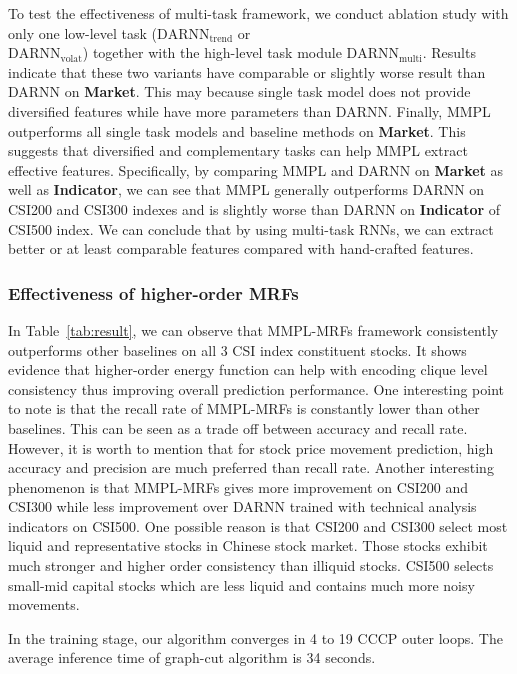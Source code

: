 To test the effectiveness of multi-task framework, we conduct ablation study with only one low-level task (\quad $\text{DARNN}_\text{trend}$ \quad or \\ $\text{DARNN}_\text{volat}$) 
together with the high-level task module $\text{DARNN}_\text{multi}$. Results
indicate that these two variants have comparable or slightly worse result than
 DARNN on \textbf{Market}. This may because single task model does not provide diversified features while have more parameters than DARNN. Finally, MMPL outperforms all single task models and baseline methods on \textbf{Market}. This
suggests that diversified and complementary tasks can help MMPL extract effective features. Specifically,
by comparing MMPL and DARNN on \textbf{Market} as well as \textbf{Indicator},
we can see that MMPL generally outperforms DARNN on CSI200 and
CSI300 indexes and is slightly worse than DARNN on \textbf{Indicator} of CSI500 index. We can conclude that by using multi-task
RNNs, we can extract better or at least comparable features compared with
hand-crafted features.
\subsubsection{Effectiveness of higher-order MRFs}
In Table~\ref{tab:result}, we can observe that MMPL-MRFs framework consistently outperforms other baselines on all 3 CSI index constituent stocks. It shows evidence that higher-order energy function can help with
encoding clique level consistency thus improving overall
prediction performance. One interesting point to note is that the recall rate of MMPL-MRFs is constantly lower than other baselines. This can be seen as a trade off between accuracy and recall rate. However, it is worth to mention that for stock price movement prediction, high accuracy and precision are much preferred than recall rate. Another interesting phenomenon is that MMPL-MRFs gives more improvement on CSI200 and CSI300 while less improvement over DARNN trained with technical
analysis indicators on CSI500. One possible reason is that CSI200 and CSI300 select most liquid and representative stocks in Chinese stock market. Those stocks exhibit much stronger and higher order consistency than illiquid stocks. CSI500 selects small-mid
capital stocks which are less liquid and contains much more noisy movements.

In the training stage, our algorithm converges in 4 to 19
CCCP outer loops. The average inference time of graph-cut
algorithm is 34 seconds.


